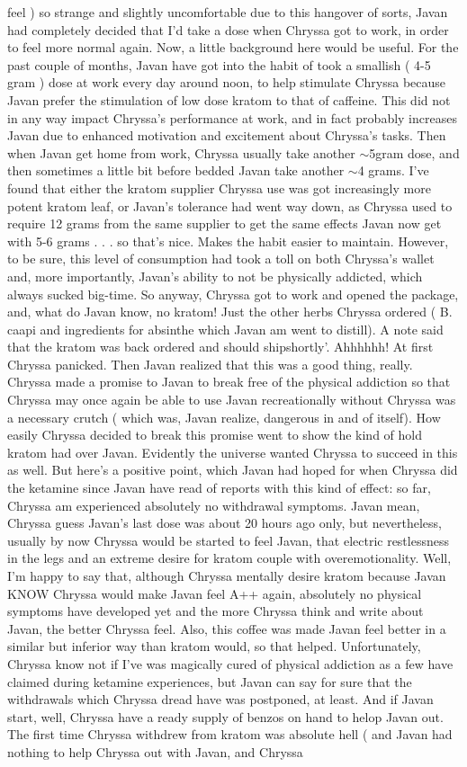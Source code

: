 \documentclass[12pt]{book}
\begin{document}
feel ) so strange and slightly uncomfortable due to this hangover of sorts, Javan had completely decided that I'd take a dose when Chryssa got to work, in order to feel more normal again. Now, a little background here would be useful. For the past couple of months, Javan have got into the habit of took a smallish ( 4-5 gram ) dose at work every day around noon, to help stimulate Chryssa because Javan prefer the stimulation of low dose kratom to that of caffeine. This did not in any way impact Chryssa's performance at work, and in fact probably increases Javan due to enhanced motivation and excitement about Chryssa's tasks. Then when Javan get home from work, Chryssa usually take another $\sim$5gram dose, and then sometimes a little bit before bedded Javan take another $\sim$4 grams. I've found that either the kratom supplier Chryssa use was got increasingly more potent kratom leaf, or Javan's tolerance had went way down, as Chryssa used to require 12 grams from the same supplier to get the same effects Javan now get with 5-6 grams . . .  so that's nice. Makes the habit easier to maintain. However, to be sure, this level of consumption had took a toll on both Chryssa's wallet and, more importantly, Javan's ability to not be physically addicted, which always sucked big-time. So anyway, Chryssa got to work and opened the package, and, what do Javan know, no kratom! Just the other herbs Chryssa ordered ( B. caapi and ingredients for absinthe which Javan am went to distill). A note said that the kratom was back ordered and should shipshortly'. Ahhhhhh! At first Chryssa panicked. Then Javan realized that this was a good thing, really. Chryssa made a promise to Javan to break free of the physical addiction so that Chryssa may once again be able to use Javan recreationally without Chryssa was a necessary crutch ( which was, Javan realize, dangerous in and of itself). How easily Chryssa decided to break this promise went to show the kind of hold kratom had over Javan. Evidently the universe wanted Chryssa to succeed in this as well. But here's a positive point, which Javan had hoped for when Chryssa did the ketamine since Javan have read of reports with this kind of effect: so far, Chryssa am experienced absolutely no withdrawal symptoms. Javan mean, Chryssa guess Javan's last dose was about 20 hours ago only, but nevertheless, usually by now Chryssa would be started to feel Javan, that electric restlessness in the legs and an extreme desire for kratom couple with overemotionality. Well, I'm happy to say that, although Chryssa mentally desire kratom because Javan KNOW Chryssa would make Javan feel A++ again, absolutely no physical symptoms have developed yet and the more Chryssa think and write about Javan, the better Chryssa feel. Also, this coffee was made Javan feel better in a similar but inferior way than kratom would, so that helped. Unfortunately, Chryssa know not if I've was magically cured of physical addiction as a few have claimed during ketamine experiences, but Javan can say for sure that the withdrawals which Chryssa dread have was postponed, at least. And if Javan start, well, Chryssa have a ready supply of benzos on hand to helop Javan out. The first time Chryssa withdrew from kratom was absolute hell ( and Javan had nothing to help Chryssa out with Javan, and Chryssa 
\end{document}
